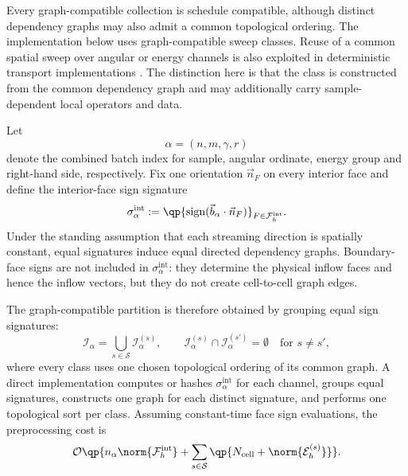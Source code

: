 \documentclass[final]{amsart}
\begin{document}
Every graph-compatible collection is schedule compatible, although
distinct dependency graphs may also admit a common topological
ordering. The implementation below uses graph-compatible sweep
classes. Reuse of a common spatial sweep over angular or energy
channels is also exploited in deterministic transport implementations
\cite{AdamsEtAl2019OptimalSweeps, SuauEtAl2024SharedMemory,
  SuauEtAl2025Vectorized}.  The distinction here is that the class is
constructed from the common dependency graph and may additionally
carry sample-dependent local operators and data.

Let
\begin{equation}
  \alpha=(n,m,\gamma,r)
\end{equation}
denote the combined batch index for sample, angular ordinate, energy
group and right-hand side, respectively. Fix one orientation
$\vec n_F$ on every interior face and define the interior-face sign
signature
\begin{equation}
  \sigma^{\mathrm{int}}_\alpha
  :=
  \qp{
    \operatorname{sign}
    (\vec b_\alpha\cdot\vec n_F)
  }_{F\in\mathcal{F}^{\mathrm{int}}_h}.
\end{equation}
Under the standing assumption that each streaming direction is
spatially constant, equal signatures induce equal directed dependency
graphs. Boundary-face signs are not included in
$\sigma^{\mathrm{int}}_\alpha$: they determine the physical inflow
faces and hence the inflow vectors, but they do not create
cell-to-cell graph edges.

The graph-compatible partition is therefore obtained by grouping equal
sign signatures:
\begin{equation}
  \mathcal{I}_\alpha
  =
  \bigcup_{s\in\mathcal{S}}
  \mathcal{I}^{(s)}_\alpha,
  \qquad
  \mathcal{I}^{(s)}_\alpha
  \cap
  \mathcal{I}^{(s')}_\alpha
  =
  \emptyset
  \quad
  \text{for }s\neq s',
\end{equation}
where every class uses one chosen topological ordering of its common
graph. A direct implementation computes or hashes
$\sigma^{\mathrm{int}}_\alpha$ for each channel, groups equal
signatures, constructs one graph for each distinct signature, and
performs one topological sort per class. Assuming constant-time face
sign evaluations, the preprocessing cost is
\begin{equation}
  \mathcal{O}
  \qp{
    n_\alpha
    \norm{\mathcal{F}^{\mathrm{int}}_h}
    +
    \sum_{s\in\mathcal{S}}
    \qp{
      N_{\mathrm{cell}}
      +
      \norm{\mathcal{E}^{(s)}_h}
    }
  }.
\end{equation}
\end{document}
